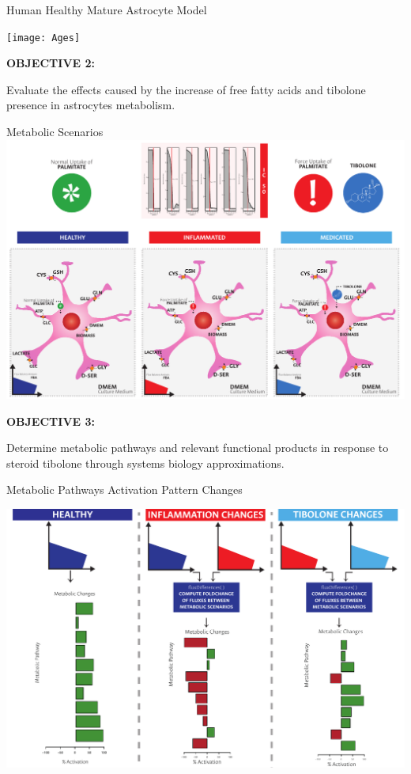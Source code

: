 \documentclass[11pt]{beamer}
\begin{document}
\begin{frame}{Human Healthy Mature Astrocyte Model}
\begin{center}
\texttt{[image: Ages]}
\end{center}
\end{frame}
\begin{frame}
\begin{block}{\textbf{OBJECTIVE 2:}}
\begin{center}
Evaluate the effects caused by the increase of free fatty acids and tibolone presence in astrocytes metabolism.\end{center}\end{block}
\end{frame}
\begin{frame}{Metabolic Scenarios}
\includegraphics[width=\textwidth]{Scenarios}
\end{frame}
\begin{frame}
\begin{block}{\textbf{OBJECTIVE 3:}}
\begin{center}
Determine metabolic pathways and relevant functional products in response to steroid tibolone through systems biology approximations.\end{center}\end{block}
\end{frame}
\begin{frame}{Metabolic Pathways Activation Pattern Changes}
\begin{center}
\includegraphics[width=\textwidth]{FluxDifferenes}
\end{center}
\end{frame}
\end{document}
